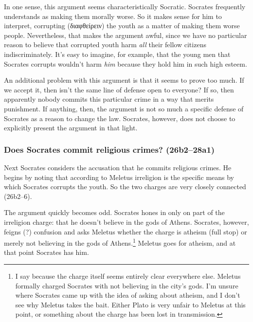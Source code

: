 \documentclass[11pt]{article}
\begin{document}
In one sense, this argument seems characteristically Socratic.  Socrates frequently understands  as making them morally worse.  So it makes sense for him to interpret, corrupting ({\g διαφθείρειν}) the youth as a matter of making them worse people.  Nevertheless, that makes the argument awful, since we have no particular reason to believe that corrupted youth harm \emph{all} their fellow citizens indiscriminately.  It's easy to imagine, for example, that the young men that Socrates corrupts wouldn't harm \emph{him} because they hold him in such high esteem.

An additional problem with this argument is that it seems to prove too much.  If we accept it, then isn't the same line of defense open to everyone?  If so, then apparently nobody commits this particular crime in a way that merits punishment.  If anything, then, the argument is not so much a specific defense of Socrates as a reason to change the law.  Socrates, however, does not choose to explicitly present the argument in that light.


\subsubsection{Does Socrates commit religious crimes? (26b2--28a1)}

Next Socrates considers the accusation that he commits religious crimes.  He begins by noting that according to Meletus irreligion is the specific means by which Socrates corrupts the youth.  So the two charges are very closely connected (26b2--6).

The argument quickly becomes odd. Socrates hones in only on part of the irreligion charge: that he doesn't believe in the gods of Athens.  Socrates, however, feigns (?) confusion and asks Meletus whether the charge is atheism (full stop) or merely not believing in the gods of Athens.\footnote{I say  because the charge itself seems entirely clear everywhere else.  Meletus formally charged Socrates with not believing in the city's gods.  I'm unsure where Socrates came up with the idea of asking about atheism, and I don't see why Meletus takes the bait.  Either Plato is very unfair to Meletus at this point, or something about the charge has been lost in transmission.}  Meletus goes for atheism, and at that point Socrates has him.
\end{document}
